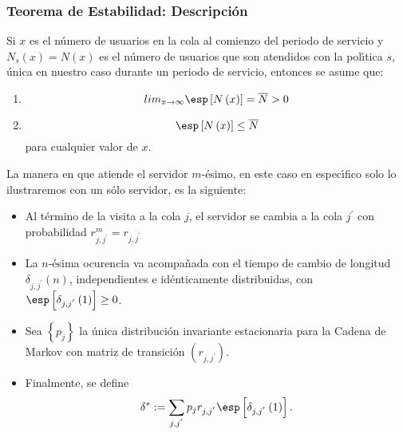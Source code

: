 \subsubsection{Teorema de Estabilidad: Descripci{\'o}n}
%


Si $x$ es el n{\'u}mero de usuarios en la cola al comienzo del
periodo de servicio y $N_{s}\left(x\right)=N\left(x\right)$ es el
n{\'u}mero de usuarios que son atendidos con la pol{\'\i}tica $s$,
{\'u}nica en nuestro caso durante un periodo de servicio, entonces
se asume que:
\begin{enumerate}
\item
\begin{equation}\label{S1}
lim_{x\rightarrow\infty}\esp\left[N\left(x\right)\right]=\overline{N}>0
\end{equation}
\item
\begin{equation}\label{S2}
\esp\left[N\left(x\right)\right]\leq \overline{N} \end{equation}
para cualquier valor de $x$.
\end{enumerate}
La manera en que atiende el servidor $m$-{\'e}simo, en este caso
en espec{\'\i}fico solo lo ilustraremos con un s{\'o}lo servidor,
es la siguiente:
\begin{itemize}
\item Al t{\'e}rmino de la visita a la cola $j$, el servidor se
cambia a la cola $j^{'}$ con probabilidad
$r_{j,j^{'}}^{m}=r_{j,j^{'}}$

\item La $n$-{\'e}sima ocurencia va acompa{\~n}ada con el tiempo
de cambio de longitud $\delta_{j,j^{'}}\left(n\right)$,
independientes e id{\'e}nticamente distribuidas, con
$\esp\left[\delta_{j,j^{'}}\left(1\right)\right]\geq0$.

\item Sea $\left\{p_{j}\right\}$ la {\'u}nica distribuci{\'o}n
invariante estacionaria para la Cadena de Markov con matriz de
transici{\'o}n $\left(r_{j,j^{'}}\right)$.

\item Finalmente, se define
\begin{equation}
\delta^{*}:=\sum_{j,j^{'}}p_{j}r_{j,j^{'}}\esp\left[\delta_{j,j^{'}}\left(1\right)\right].
\end{equation}
\end{itemize}

